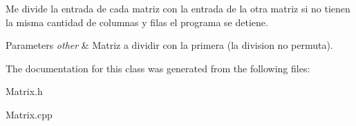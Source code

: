 Me divide la entrada de cada matriz con la entrada de la otra matriz si no tienen la misma cantidad de columnas y filas el programa se detiene. 


\begin{DoxyParams}{Parameters}
{\em other} & Matriz a dividir con la primera (la division no permuta). \\
\hline
\end{DoxyParams}


The documentation for this class was generated from the following files\+:\begin{DoxyCompactItemize}
\item 
Matrix.\+h\item 
Matrix.\+cpp\end{DoxyCompactItemize}
